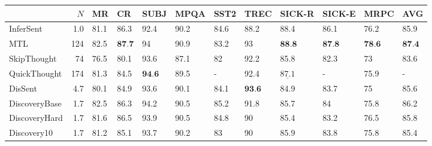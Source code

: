 \documentclass[11pt,a4paper]{article}
\begin{document}
\begin{table*}[htb]
\begin{small}
\centering
\begin{tabular}{lrllllllllll}
\toprule
{} &      $N$ &               MR &                  CR &             SUBJ &             MPQA &             SST2 &             TREC &     SICK-R &   SICK-E &                MRPC &               AVG \\
\midrule
InferSent         &    1.0 &             81.1 &                86.3 &             92.4 &             90.2 &             84.6 &             88.2 &                88.4 &             86.1 &                76.2 &                85.9 \\
MTL               &  124 &             82.5 &     $\textbf{87.7}$ &               94 &             90.9 &             83.2 &               93 &     $\textbf{88.8}$ &  $\textbf{87.8}$ &     $\textbf{78.6}$ &     $\textbf{87.4}$ \\
\midrule
SkipThought       &   74&             76.5 &                80.1 &             93.6 &             87.1 &               82 &             92.2 &                85.8 &             82.3 &                  73 &                83.6 \\
QuickThought      &  174 &             81.3 &                84.5 &  $\textbf{94.6}$ &             89.5 &              - &             92.4 &  $\underline{87.1}$ &              - &                75.9 &               - \\
DisSent           &    4.7 &             80.1 &                84.9 &             93.6 &             90.1 &             84.1 &  $\textbf{93.6}$ &                84.9 &             83.7 &                  75 &                85.6 \\
DiscoveryBase         &    1.7 &             82.5 &                86.3 &             94.2 &             90.5 &             85.2 &             91.8 &                85.7 &               84 &                75.8 &                86.2 \\
DiscoveryHard     &    1.7 &             81.6 &                86.5 &             93.9 &             90.5 &             84.8 &               90 &                85.4 &             83.2 &                76.5 &                85.8 \\
Discovery10       &    1.7 &             81.2 &                85.1 &             93.7 &             90.2 &               83 &               90 &                85.9 &             83.8 &                75.8 &                85.4 \\

\end{tabular}
\end{small}
\end{table*}
\end{document}
